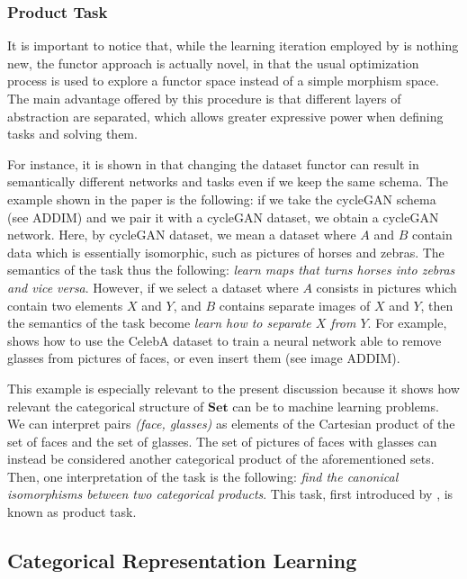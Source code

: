 \documentclass[12pt,a4paper,openright,twoside]{report}
\theoremstyle{plain}
\theoremstyle{definition}
\begin{document}
\subsubsection{Product Task}


It is important to notice that, while the learning iteration employed by \cite{gavranovic2019compositional} is nothing new, the functor approach is actually novel, in that the usual optimization process is used to explore a functor space instead of a simple morphism space. The main advantage offered by this procedure is that different layers of abstraction are separated, which allows greater expressive power when defining tasks and solving them. 


For instance, it is shown in \cite{gavranovic2019compositional} that changing the dataset functor can result in semantically different networks and tasks even if we keep the same schema. The example shown in the paper is the following: if we take the cycleGAN schema (see ADDIM) and we pair it with a cycleGAN dataset, we obtain a cycleGAN network. Here, by cycleGAN dataset, we mean a dataset where $A$ and $B$ contain data which is essentially isomorphic, such as pictures of horses and zebras. The semantics of the task thus the following: \textit{learn maps that turns horses into zebras and vice versa}. However, if we select a dataset where $A$ consists in pictures which contain two elements $X$ and $Y$, and $B$ contains separate images of $X$ and $Y$, then the semantics of the task become \textit{learn how to separate $X$ from $Y$}. For example, \cite{gavranovic2019compositional} shows how to use the CelebA dataset to train a neural network able to remove glasses from pictures of faces, or even insert them (see image ADDIM).


This example is especially relevant to the present discussion because it shows how relevant the categorical structure of $\mathbf{Set}$ can be to machine learning problems. We can interpret pairs \textit{(face, glasses)} as elements of the Cartesian product of the set of faces and the set of glasses. The set of pictures of faces with glasses can instead be considered another categorical product of the aforementioned sets. Then, one interpretation of the task is the following: \textit{find the canonical isomorphisms between two categorical products}. This task, first introduced by \cite{gavranovic2019compositional}, is known as product task.





\subsection{Categorical Representation Learning}
\end{document}
